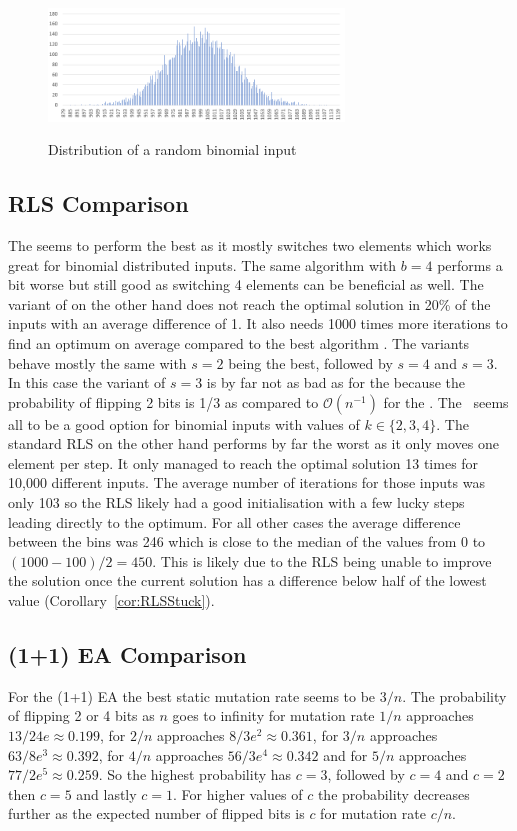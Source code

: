 \begin{figure}[h]
      \caption{Distribution of a random binomial input}
      \centering
      \includegraphics[width=0.7\textwidth]{figures/images/numberGenerator/binomialDistributionForN10000p0_1.png}\label{fig:binDistExample}
\end{figure}
\subsection{RLS Comparison}


The \RLSN[2] seems to perform the best as it mostly switches two elements which works great for binomial distributed inputs.
The same algorithm with $b=4$ performs a bit worse but still good as switching 4 elements can be beneficial as well.
The variant of \RLSN[3] on the other hand does not reach the optimal solution in 20\% of the inputs with an average difference of 1.
It also needs 1000 times more iterations to find an optimum on average compared to the best algorithm \RLSN[2].
The \RLSR[s] variants behave mostly the same with $s=2$ being the best, followed by $s=4$ and $s=3$.
In this case the variant of $s=3$ is by far not as bad as for the \RLSN[3] because the probability of flipping 2 bits is 1/3 as compared to $\mathcal{O}(n^{-1})$ for the \RLSN[3].
The \RLSR~seems all to be a good option for binomial inputs with values of $k\in\{2,3,4\}$.
The standard RLS on the other hand performs by far the worst as it only moves one element per step.
It only managed to reach the optimal solution 13 times for 10,000 different inputs.
The average number of iterations for those inputs was only 103 so the RLS likely had a good initialisation with a few lucky steps leading directly to the optimum.
For all other cases the average difference between the bins was 246 which is close to the median of the values from 0 to $(1000-100)/2=450$.
This is likely due to the RLS being unable to improve the solution once the current solution has a difference below half of the lowest value (Corollary~\ref{cor:RLSStuck}).
\subsection{(1+1) EA Comparison}
For the (1+1) EA the best static mutation rate seems to be $3/n$.
The probability of flipping 2 or 4 bits as $n$ goes to infinity for mutation rate $1/n$ approaches $13/24e\approx 0.199$, for $2/n$ approaches $8/3e^2\approx 0.361$, for $3/n$ approaches $63/8e^3\approx 0.392$, for $4/n$ approaches $56/3e^4\approx 0.342$ and for $5/n$ approaches $77/2e^5\approx 0.259$.
So the highest probability has $c=3$, followed by $c=4$ and $c=2$ then $c=5$ and lastly $c=1$.
For higher values of $c$ the probability decreases further as the expected number of flipped bits is $c$ for mutation rate $c/n$.

